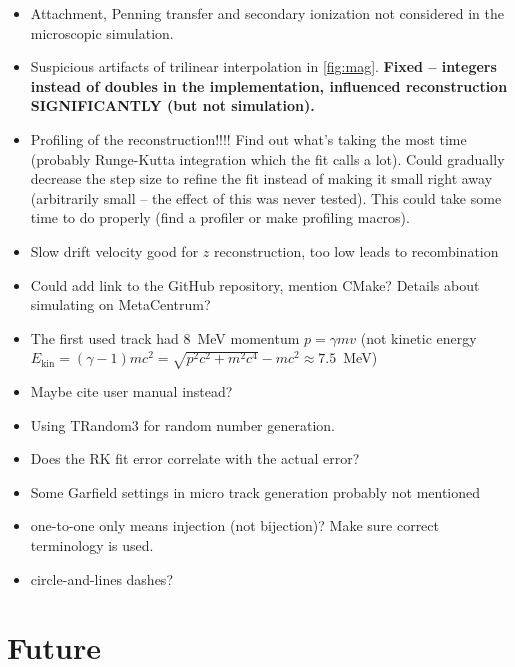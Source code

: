 {\begin{itemize}[topsep=4pt,itemsep=2pt]
				\item Attachment, Penning transfer and secondary ionization not considered in the microscopic simulation.
				\item Suspicious artifacts of trilinear interpolation in \cref{fig:mag}. \textbf{Fixed -- integers instead of doubles in the implementation, influenced reconstruction SIGNIFICANTLY (but not simulation).}
				\item Profiling of the reconstruction!!!! Find out what's taking the most time (probably Runge-Kutta integration which the fit calls a lot). Could gradually decrease the step size to refine the fit instead of making it small right away (arbitrarily small -- the effect of this was never tested). This could take some time to do properly (find a profiler or make profiling macros).
				\item Slow drift velocity good for $z$ reconstruction, too low leads to recombination
				\item Could add link to the GitHub repository, mention CMake? Details about simulating on MetaCentrum?
				\item The first used track had 8~MeV momentum $p = \gamma m v$ (not kinetic energy $E_\text{kin} = (\gamma-1) m c^2 = \sqrt{p^2c^2+m^2c^4}-mc^2 \approx 7.5$~MeV)
				\item Maybe cite \garfieldpp user manual instead?
				\item Using TRandom3 for random number generation.
				\item Does the RK fit error correlate with the actual error?
				\item Some Garfield settings in micro track generation probably not mentioned
				\item one-to-one only means injection (not bijection)? Make sure correct terminology is used.
				\item circle-and-lines dashes?
			\end{itemize}
		}
	\section*{Future}
	
